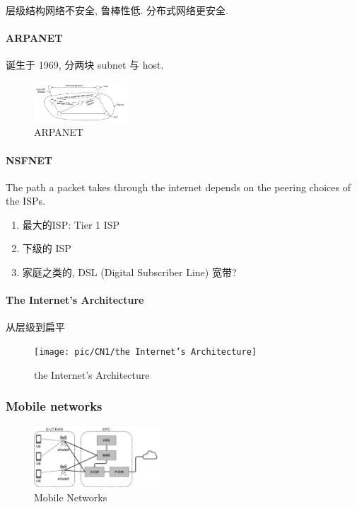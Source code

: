 层级结构网络不安全, 鲁棒性低. 分布式网络更安全. 

\paragraph{ARPANET} 诞生于 1969, 分两块 subnet 与 host. 
\begin{figure}[!htb]
    \centering
    \includegraphics[width=0.309\textwidth]{pic/CN1/ARPANET.png}
    \caption{ARPANET}
\end{figure}

\paragraph{NSFNET} The path a packet takes through the internet depends on the peering choices of the ISPs. 

\begin{enumerate}
    \item 最大的ISP: Tier 1 ISP
    \item 下级的 ISP
    \item 家庭之类的, DSL (Digital Subscriber Line) 宽带?
\end{enumerate}

\paragraph{The Internet’s Architecture}从层级到扁平 %

\begin{figure}[!htb]
    \centering
    \texttt{[image: pic/CN1/the Internet’s Architecture]}
    \caption{the Internet’s Architecture}
\end{figure}

\subsubsection{Mobile networks}
\begin{figure}[!htb]
    \centering
    \includegraphics[width=0.42\textwidth]{pic/CN1/Mobile Networks}
    \caption{Mobile Networks}
\end{figure}

